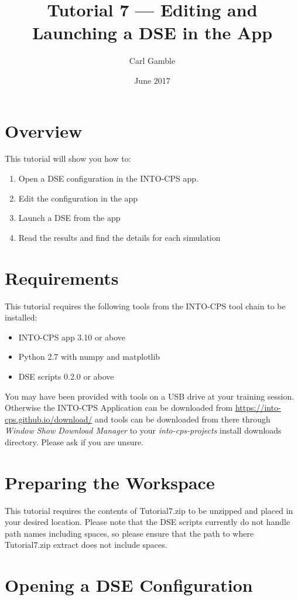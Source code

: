 \documentclass[11pt,a4paper]{../tutorial}
\title{Tutorial 7 --- Editing and Launching a DSE in the App}
\date{June 2017}
\author{Carl Gamble}
\begin{document}
\section*{Overview}

This tutorial will show you how to:

\begin{enumerate}[noitemsep]
\item Open a DSE configuration in the INTO-CPS app.
\item Edit the configuration in the app
\item Launch a DSE from the app
\item Read the results and find the details for each simulation
\end{enumerate}

\section*{Requirements}

This tutorial requires the following tools from the INTO-CPS tool chain to be installed:

\begin{itemize}[noitemsep]
\item INTO-CPS app 3.10 or above
\item Python 2.7 with numpy and matplotlib
\item DSE scripts 0.2.0 or above
\end{itemize}

You may have been provided with tools on a USB drive at your training session. Otherwise the INTO-CPS Application can be downloaded from \url{https://into-cps.github.io/download/} and tools can be downloaded from there through \emph{Window \menusep Show Download Manager} to your \emph{into-cps-projects} install downloads directory. Please ask if you are unsure.


\section{Preparing the Workspace}
This tutorial requires the contents of Tutorial7.zip to be unzipped and placed in your desired location.  Please note that the DSE scripts currently do not handle path names including spaces, so please ensure that the path to where Tutorial7.zip extract does not include spaces.


\newpage

\section{Opening a DSE Configuration}
\end{document}
